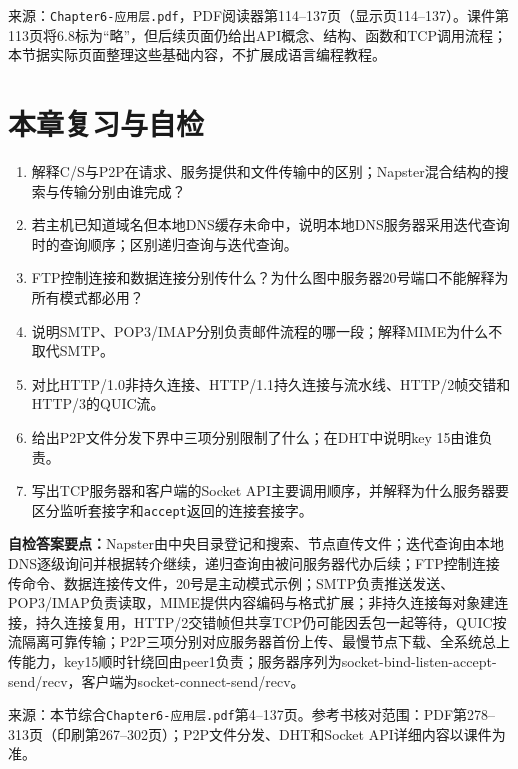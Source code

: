 \annotationarea[4]
\small 来源：\texttt{Chapter6-应用层.pdf}，PDF阅读器第114--137页（显示页114--137）。课件第113页将6.8标为“略”，但后续页面仍给出API概念、结构、函数和TCP调用流程；本节据实际页面整理这些基础内容，不扩展成语言编程教程。\normalsize

\section*{本章复习与自检}
\begin{enumerate}[nosep]
\item 解释C/S与P2P在请求、服务提供和文件传输中的区别；Napster混合结构的搜索与传输分别由谁完成？
\item 若主机已知道域名但本地DNS缓存未命中，说明本地DNS服务器采用迭代查询时的查询顺序；区别递归查询与迭代查询。
\item FTP控制连接和数据连接分别传什么？为什么图中服务器20号端口不能解释为所有模式都必用？
\item 说明SMTP、POP3/IMAP分别负责邮件流程的哪一段；解释MIME为什么不取代SMTP。
\item 对比HTTP/1.0非持久连接、HTTP/1.1持久连接与流水线、HTTP/2帧交错和HTTP/3的QUIC流。
\item 给出P2P文件分发下界中三项分别限制了什么；在DHT中说明key 15由谁负责。
\item 写出TCP服务器和客户端的Socket API主要调用顺序，并解释为什么服务器要区分监听套接字和\texttt{accept}返回的连接套接字。
\end{enumerate}
\textbf{自检答案要点：}Napster由中央目录登记和搜索、节点直传文件；迭代查询由本地DNS逐级询问并根据转介继续，递归查询由被问服务器代办后续；FTP控制连接传命令、数据连接传文件，20号是主动模式示例；SMTP负责推送发送、POP3/IMAP负责读取，MIME提供内容编码与格式扩展；非持久连接每对象建连接，持久连接复用，HTTP/2交错帧但共享TCP仍可能因丢包一起等待，QUIC按流隔离可靠传输；P2P三项分别对应服务器首份上传、最慢节点下载、全系统总上传能力，key15顺时针绕回由peer1负责；服务器序列为socket-bind-listen-accept-send/recv，客户端为socket-connect-send/recv。

\small 来源：本节综合\texttt{Chapter6-应用层.pdf}第4--137页。参考书核对范围：PDF第278--313页（印刷第267--302页）；P2P文件分发、DHT和Socket API详细内容以课件为准。\normalsize
